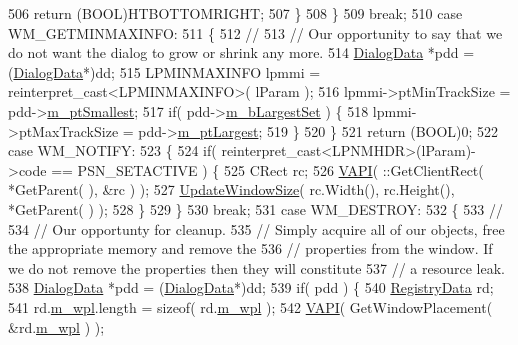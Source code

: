 \begin{DoxyCode}
506           \textcolor{keywordflow}{return} (BOOL)HTBOTTOMRIGHT;
507       \}
508     \}
509     \textcolor{keywordflow}{break};
510   \textcolor{keywordflow}{case} WM\_GETMINMAXINFO:
511     \{
512       \textcolor{comment}{//}
513       \textcolor{comment}{//        Our opportunity to say that we do not want the dialog to grow or shrink any more.}
514       \mbox{\hyperlink{struct_dialog_data}{DialogData}} *pdd = (\mbox{\hyperlink{struct_dialog_data}{DialogData}}*)dd;
515       LPMINMAXINFO lpmmi = \textcolor{keyword}{reinterpret\_cast<}LPMINMAXINFO\textcolor{keyword}{>}( lParam );
516       lpmmi->ptMinTrackSize = pdd->\mbox{\hyperlink{struct_dialog_data_a48eb19417544d0c6ddfd1bd9c03cd2e5}{m\_ptSmallest}};
517       \textcolor{keywordflow}{if}( pdd->\mbox{\hyperlink{struct_dialog_data_abffcfeeb5f8f9b1ecd84d9bdf7706b07}{m\_bLargestSet}} ) \{
518         lpmmi->ptMaxTrackSize = pdd->\mbox{\hyperlink{struct_dialog_data_a577bccf59e71fb65969247d1f8275448}{m\_ptLargest}};
519       \}
520     \}
521     \textcolor{keywordflow}{return} (BOOL)0;
522   \textcolor{keywordflow}{case} WM\_NOTIFY:
523     \{
524       \textcolor{keywordflow}{if}( reinterpret\_cast<LPNMHDR>(lParam)->code == PSN\_SETACTIVE ) \{
525         CRect rc;
526         \mbox{\hyperlink{_win_helper_8h_a5b2d2a39a00a17407c148a7392e32895}{VAPI}}( ::GetClientRect( *GetParent( ), &rc ) );
527         \mbox{\hyperlink{class_resize_dlg_ae2d0d2b44dd32f668c6d9091b14bfc00}{UpdateWindowSize}}( rc.Width(), rc.Height(), *GetParent( ) );
528       \}
529     \}
530     \textcolor{keywordflow}{break};
531   \textcolor{keywordflow}{case} WM\_DESTROY:
532     \{
533       \textcolor{comment}{//}
534       \textcolor{comment}{//        Our opportunty for cleanup.}
535       \textcolor{comment}{//        Simply acquire all of our objects, free the appropriate memory and remove the }
536       \textcolor{comment}{//        properties from the window. If we do not remove the properties then they will constitute}
537       \textcolor{comment}{//        a resource leak.}
538       \mbox{\hyperlink{struct_dialog_data}{DialogData}} *pdd = (\mbox{\hyperlink{struct_dialog_data}{DialogData}}*)dd;
539       \textcolor{keywordflow}{if}( pdd ) \{
540         \mbox{\hyperlink{struct_registry_data}{RegistryData}} rd;
541         rd.\mbox{\hyperlink{struct_registry_data_a8635a0973196376667281ae2ae52e6be}{m\_wpl}}.length = \textcolor{keyword}{sizeof}( rd.\mbox{\hyperlink{struct_registry_data_a8635a0973196376667281ae2ae52e6be}{m\_wpl}} );
542         \mbox{\hyperlink{_win_helper_8h_a5b2d2a39a00a17407c148a7392e32895}{VAPI}}( GetWindowPlacement( &rd.\mbox{\hyperlink{struct_registry_data_a8635a0973196376667281ae2ae52e6be}{m\_wpl}} ) );

\end{DoxyCode}
